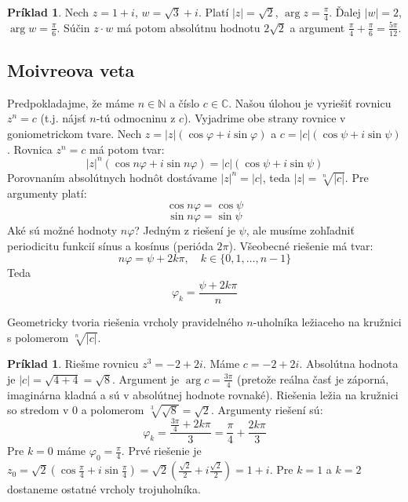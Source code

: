 \documentclass[11pt,a4paper]{article}
\theoremstyle{definition}
\newtheorem{priklad}[definicia]{Príklad}
\theoremstyle{plain}
\theoremstyle{remark}
\newcommand{\Nat}{\mathbb{N}}
\begin{document}
\begin{priklad}
Nech $z = 1+i$, $w = \sqrt{3}+i$.
Platí $|z| = \sqrt{2}$, $\arg z = \frac{\pi}{4}$.
Ďalej $|w| = 2$, $\arg w = \frac{\pi}{6}$.
Súčin $z \cdot w$ má potom absolútnu hodnotu $2\sqrt{2}$ a argument $\frac{\pi}{4} + \frac{\pi}{6} = \frac{5\pi}{12}$.
\end{priklad}


\subsection{Moivreova veta}
Predpokladajme, že máme $n \in \Nat$ a číslo $c \in \mathbb{C}$. Našou úlohou je vyriešiť rovnicu $z^n = c$ (t.j. nájsť $n$-tú odmocninu z $c$).
Vyjadrime obe strany rovnice v goniometrickom tvare. Nech $z = |z|(\cos \varphi + i \sin \varphi)$ a $c = |c|(\cos \psi + i \sin \psi)$.
Rovnica $z^n = c$ má potom tvar:
\[ |z|^n (\cos n\varphi + i \sin n\varphi) = |c|(\cos \psi + i \sin \psi) \]
Porovnaním absolútnych hodnôt dostávame $|z|^n = |c|$, teda $|z| = \sqrt[n]{|c|}$.
Pre argumenty platí:
\[ \cos n\varphi = \cos \psi \]
\[ \sin n\varphi = \sin \psi \]
Aké sú možné hodnoty $n\varphi$?
Jedným z riešení je $\psi$, ale musíme zohľadniť periodicitu funkcií sínus a kosínus (perióda $2\pi$). Všeobecné riešenie má tvar:
\[ n\varphi = \psi + 2k\pi, \quad k \in \{0, 1, \dots, n-1\} \]
Teda
\[ \varphi_k = \frac{\psi + 2k\pi}{n} \]

Geometricky tvoria riešenia vrcholy pravidelného $n$-uholníka ležiaceho na kružnici s polomerom $\sqrt[n]{|c|}$.

\begin{priklad}
Riešme rovnicu $z^3 = -2 + 2i$.
Máme $c = -2+2i$. Absolútna hodnota je $|c| = \sqrt{4+4} = \sqrt{8}$.
Argument je $\arg c = \frac{3\pi}{4}$ (pretože reálna časť je záporná, imaginárna kladná a sú v absolútnej hodnote rovnaké).
Riešenia ležia na kružnici so stredom v 0 a polomerom $\sqrt[3]{\sqrt{8}} = \sqrt{2}$.
Argumenty riešení sú:
\[ \varphi_k = \frac{\frac{3\pi}{4} + 2k\pi}{3} = \frac{\pi}{4} + \frac{2k\pi}{3} \]
Pre $k=0$ máme $\varphi_0 = \frac{\pi}{4}$. Prvé riešenie je $z_0 = \sqrt{2}(\cos \frac{\pi}{4} + i \sin \frac{\pi}{4}) = \sqrt{2}(\frac{\sqrt{2}}{2} + i\frac{\sqrt{2}}{2}) = 1+i$.
Pre $k=1$ a $k=2$ dostaneme ostatné vrcholy trojuholníka.
\end{priklad}
\end{document}
